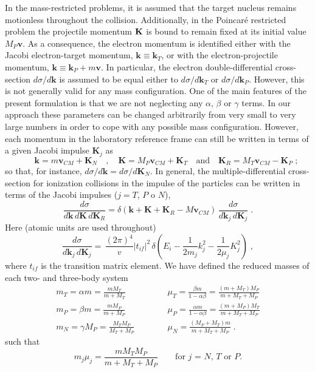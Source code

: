 In the mass-restricted problems, it is assumed that the target nucleus remains motionless throughout the collision. Additionally, in the Poincar\'{e} restricted problem the projectile momentum $\bf K$ is bound to remain fixed at its initial value $M_{P} \bm{v}$. As a consequence, the electron momentum is identified either with the Jacobi electron-target momentum, $\bm{k} \equiv \bm{k}_{T}$, or with the electron-projectile momentum, $\bm{k} \equiv \bm{k}_{P}+ m \bm{v}$. In particular, the electron double-differential cross-section $d \sigma / d \bm{k}$ is assumed to be equal either to $d \sigma / d \bm{k}_T$ or $d \sigma / d \bm{k}_P$. However, this is not generally valid for any mass configuration. One of the main features of the present formulation is that we are not neglecting any $\alpha$, $\beta$ or $\gamma$ terms.  In our approach these parameters can be changed arbitrarily from very
small to very large numbers in order to cope with any possible mass configuration. However, each momentum in the laboratory reference frame can still be written in terms of a given Jacobi impulse $\bm{K}_j$ as
\begin{equation}\label{Q:1}
  \qquad \bm{k} = m \bm{v}_{CM} + \bm{K}_N \quad , \quad \bm{K} =
  M_P \bm{v}_{CM} + \bm{K}_T \quad \mbox{and} \quad \bm{K}_R = M_T
  \bm{v}_{CM} - \bm{K}_P \; ;
\end{equation}
so that, for instance, $d \sigma / d \bm{k} = d \sigma / d \bm{K}_N$. In general, the multiple-differential cross-section for ionization collisions in the impulse of the particles can be written in terms of the Jacobi impulses ($j=T$, $P$ o $N$),
\begin{equation}\label{Q:2}
  \frac
  {d \sigma} {d \bm{k} \, d \bm{K} \,d \bm{K}_R} = \delta
  \left( \bm{k} + \bm{K} + \bm{K}_R - M \bm{v}_{CM}\right) \, \frac {d
    \sigma} {d \bm{k}_j \, d \bm{K}_j} \; .
\end{equation}
Here (atomic units are used throughout)
\begin{equation}\label{Q:3}
  \frac {d \sigma} {d \bm{k}_j \, d \bm{K}_j}= \,
  \frac{(2\pi)^4}{v} |t_{if}|^2 \, \delta \left(E_i - \frac{1}{2 m_j}
    k_j^2 - \frac{1}{2 \mu_j} K_j^2 \right) \; ,
\end{equation}
where $t_{if}$ is the transition matrix element. We have defined the reduced masses of each two- and three-body system
\begin{eqnarray*}
  m_T = \alpha m = \frac{m M_T}{m + M_T} & & \; \mu_T = \frac {\beta m} {1 - \alpha \beta} =
  \frac{(m + M_T)M_P}{m + M_T + M_P} \\ m_P = \beta m = \frac{m M_P}{m + M_P} & & \; \mu _P = \frac
  {\alpha m} {1 - \alpha \beta} = \frac{(m + M_P) M_T}{m + M_T + M_P} \\ m_N=\gamma M_P = \frac{M_T
    M_P}{M_T + M_P} \qquad & & \; \mu_N = \frac{(M_P + M_T) m} {m + M_T + M_P} \; .
\end{eqnarray*}
such that
\[
m_j \mu_j = \frac {m M_T M_P} {m + M_T + M_P} \qquad \mbox{for $j$ = $N$, $T$ or $P$.}
\]

